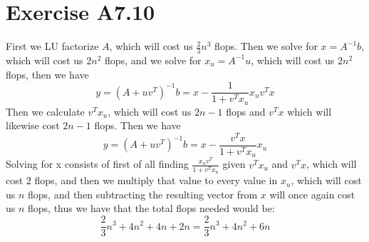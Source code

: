 \section*{Exercise A7.10}
First we LU factorize $A$, which will cost us $\frac{2}{3}n^3$ flops. 
Then we solve for $x=A^{-1}b$, which will cost us $2n^2$ flops, and we solve
for $x_u=A^{-1}u$, which will cost us $2n^2$ flops, then we have
$$y=(A+uv^T)^{-1}b=x-\frac{1}{1+v^Tx_u}x_uv^Tx$$
Then we calculate $v^Tx_u$, which will cost us $2n-1$ flops and 
$v^Tx$ which will likewise cost $2n-1$ flops. Then we have
$$y=(A+uv^T)^{-1}b=x-\frac{v^Tx}{1+v^Tx_u}x_u$$
Solving for x consists of first of all finding $\frac{x_uv^T}{1+v^Tx_u}$ given 
$v^Tx_u$ and $v^Tx$, which will cost $2$ flops, and then we multiply that value 
to every value in $x_u$, which will cost us $n$ flops, and then subtracting
the resulting vector from $x$ will once again cost us $n$ flops, 
thus we have that the total flops needed would be:
$$\frac{2}{3}n^3+4n^2+4n+2n=\boxed{\frac{2}{3}n^3+4n^2+6n}$$




  


